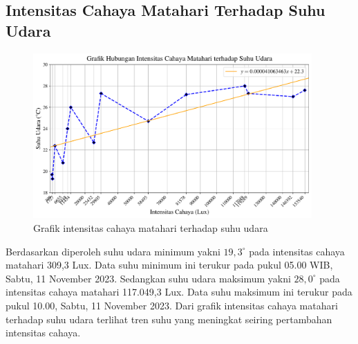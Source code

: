 \subsection{Intensitas Cahaya Matahari Terhadap Suhu Udara}
\begin{figure}
    \includegraphics[width=0.95\textwidth]{dataset/grafik intensitas vs suhu.pdf}
    \caption{Grafik intensitas cahaya matahari terhadap suhu udara}
\end{figure}
Berdasarkan  diperoleh suhu udara minimum yakni $19,3^\circ$ pada intensitas cahaya matahari 309,3 Lux. Data suhu minimum ini terukur pada pukul 05.00 WIB, Sabtu, 11 November 2023. Sedangkan suhu udara maksimum yakni $28,0^\circ$ pada intensitas cahaya matahari 117.049,3 Lux. Data suhu maksimum ini terukur pada pukul 10.00, Sabtu, 11 November 2023. Dari grafik intensitas cahaya matahari terhadap suhu udara terlihat tren suhu yang meningkat seiring pertambahan intensitas cahaya.

